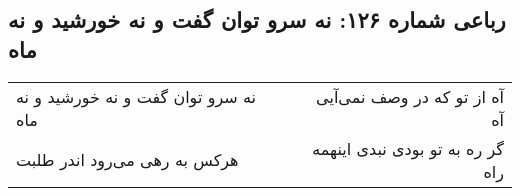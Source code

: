 \begin{center}
\section*{رباعی شماره ۱۲۶: نه سرو توان گفت و نه خورشید و نه ماه}
\label{sec:126}
\begin{longtable}{l p{0.5cm} r}
نه سرو توان گفت و نه خورشید و نه ماه
&&
آه از تو که در وصف نمی‌آیی آه
\\
هرکس به رهی می‌رود اندر طلبت
&&
گر ره به تو بودی نبدی اینهمه راه
\\
\end{longtable}
\end{center}
